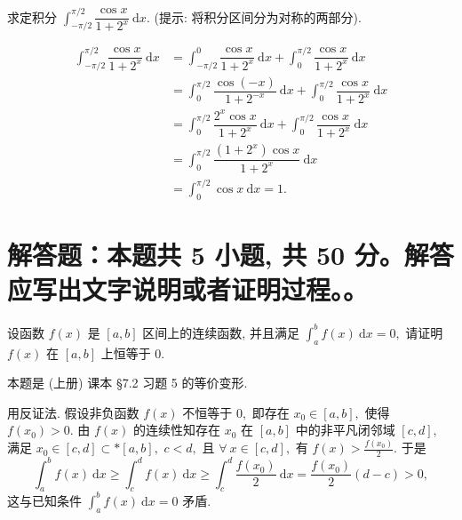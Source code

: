 \begin{question}[points = 10]
求定积分 $\displaystyle \int_{-\pi/2}^{\pi/2} \dfrac{\cos x}{1 + 2^x} ~ \mathrm{d}x.$ (提示: 将积分区间分为对称的两部分).

\end{question}

\begin{solution}
\begin{align*}
\int_{-\pi/2}^{\pi/2} \dfrac{\cos x}{1 + 2^x} ~ \mathrm{d}x & = \int_{-\pi/2}^{0} \dfrac{\cos x}{1 + 2^x} ~ \mathrm{d}x + \int_{0}^{\pi/2} \dfrac{\cos x}{1 + 2^x} ~ \mathrm{d}x \\
& = \int_{0}^{\pi/2} \dfrac{\cos (-x)}{1 + 2^{-x}} ~ \mathrm{d}x + \int_{0}^{\pi/2} \dfrac{\cos x}{1 + 2^x} ~ \mathrm{d}x \\
& = \int_{0}^{\pi/2} \dfrac{2^{x} \cos x}{1 + 2^{x}} ~ \mathrm{d}x + \int_{0}^{\pi/2} \dfrac{\cos x}{1 + 2^x} ~ \mathrm{d}x \\
& = \int_{0}^{\pi/2} \dfrac{(1 + 2^{x}) \cos x}{1 + 2^{x}} ~ \mathrm{d}x \\
& = \int_{0}^{\pi/2} \cos x ~ \mathrm{d}x = 1.
\end{align*}
\end{solution}


\section{解答题：本题共 5 小题, 共 50 分。解答应写出文字说明或者证明过程。。}


\begin{question}[points = 8]
设函数 $f(x)$ 是 $[a, b]$ 区间上的连续函数, 并且满足 $\displaystyle \int_a^b f(x) ~ \mathrm{d}x = 0,$ 请证明 $f(x)$ 在 $[a, b]$ 上恒等于 $0.$

\end{question}

\begin{solution}
本题是 (上册) 课本 \S 7.2 习题 5 的等价变形.

用反证法. 假设非负函数 $f(x)$ 不恒等于 $0,$ 即存在 $x_0 \in [a,b],$ 使得 $f(x_0) > 0.$ 由 $f(x)$ 的连续性知存在 $x_0$ 在 $[a, b]$ 中的非平凡闭邻域 $[c, d],$ 满足 $x_0 \in [c, d] \subset* [a, b],$ $c < d,$ 且 $\forall ~ x \in [c, d],$ 有 $f(x) > \frac{f(x_0)}{2}.$ 于是
\begin{equation*}
\int_a^b f(x) ~ \mathrm{d}x \geqslant \int_c^d f(x) ~ \mathrm{d}x \geqslant \int_c^d \frac{f(x_0)}{2} ~ \mathrm{d}x = \frac{f(x_0)}{2}(d - c) > 0,
\end{equation*}
这与已知条件 $\displaystyle \int_a^b f(x) ~ \mathrm{d}x = 0$ 矛盾.
\end{solution}


